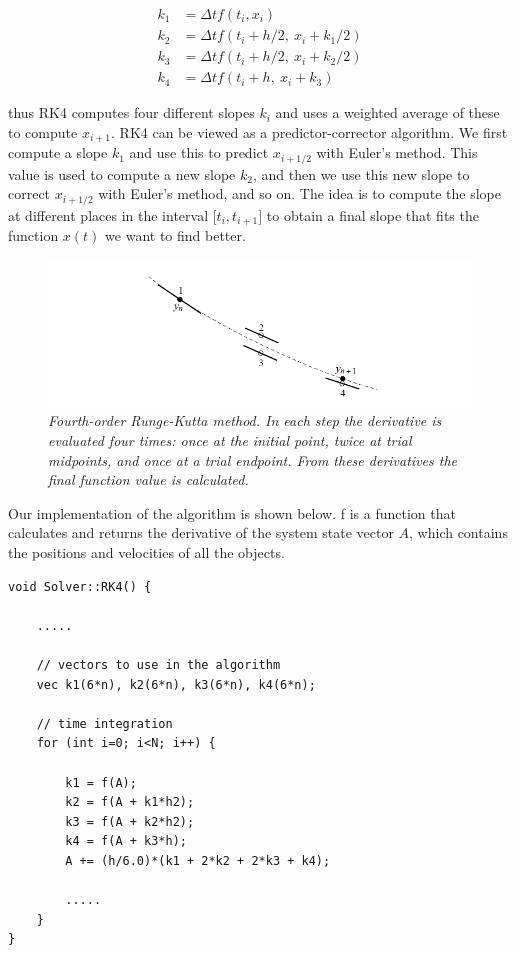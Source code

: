 \documentclass[a4paper,12pt, english]{article}
\begin{document}
\begin{equation}
\begin{split}
k_1 &= \Delta t f(t_i,x_i) \\
k_2 &= \Delta t f(t_i + h/2, \ x_i + k_1/2) \\
k_3 &= \Delta t f(t_i + h/2, \ x_i + k_2/2) \\
k_4 &= \Delta t f(t_i + h, \ x_i + k_3)
\end{split}
\end{equation}

thus RK4 computes four different slopes $k_i$ and uses a weighted average of these to compute $x_{i+1}$. RK4 can be viewed as a predictor-corrector algorithm. We first compute a slope $k_1$ and use this to predict $x_{i+1/2}$ with Euler's method. This value is used to compute a new slope $k_2$, and then we use this new slope to correct $x_{i+1/2}$ with Euler's method, and so on. The idea is to compute the slope at different places in the interval $\lbrack t_i,t_{i+1} \rbrack$ to obtain a final slope that fits the function $x(t)$ we want to find better.

\begin{figure}[H]
  \centering \includegraphics[scale=0.5]{rk4.png}
  \caption{\textit{Fourth-order Runge-Kutta method. In each step the derivative is evaluated four times:
once at the initial point, twice at trial midpoints, and once at a trial endpoint. From these derivatives the
final function value is calculated. }}
\end{figure}

\lstset{
  basicstyle=\small\ttfamily,
  frame=lrtb,
  numbers=left
}

Our implementation of the algorithm is shown below. f is a function that calculates and returns the derivative of the system state vector $A$, which contains the positions and velocities of all the objects.

\begin{lstlisting}[title={Function RK4}]
void Solver::RK4() {

    .....

    // vectors to use in the algorithm
    vec k1(6*n), k2(6*n), k3(6*n), k4(6*n);
 
    // time integration
    for (int i=0; i<N; i++) {

        k1 = f(A);
        k2 = f(A + k1*h2);
        k3 = f(A + k2*h2);
        k4 = f(A + k3*h);
        A += (h/6.0)*(k1 + 2*k2 + 2*k3 + k4);
        
        .....
    }
}
\end{lstlisting}
\end{document}
